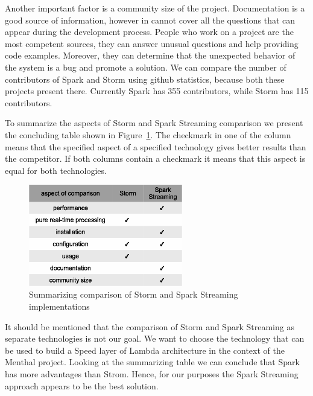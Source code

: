Another important factor is a community size of the project.
Documentation is a good source of information, however in cannot cover all the questions that can appear during the development process.
People who work on a project are the most competent sources, they can answer unusual questions and help providing code examples.
Moreover, they can determine that the unexpected behavior of the system is a bug and promote a solution.
We can compare the number of contributors of Spark and Storm using github statistics, because both these projects present there.
Currently Spark has 355 contributors, while Storm has 115 contributors. 

To summarize the aspects of Storm and Spark Streaming comparison we present the concluding table shown in Figure~\ref{fig:storm_spark_comparison}.
The checkmark in one of the column means that the specified aspect of a specified technology gives better results than the competitor.
If both columns contain a checkmark it means that this aspect is equal for both technologies.

\begin{figure}[h]
  \centering
  \includegraphics [width=0.6\textwidth]{images/storm_spark_comparison}
  \caption{Summarizing comparison of Storm and Spark Streaming implementations}
  \label{fig:storm_spark_comparison}
\end{figure}

It should be mentioned that the comparison of Storm and Spark Streaming as separate technologies is not our goal.
We want to choose the technology that can be used to build a Speed layer of Lambda architecture in the context of the Menthal project.
Looking at the summarizing table we can conclude that Spark has more advantages than Strom.
Hence, for our purposes the Spark Streaming approach appears to be the best solution.